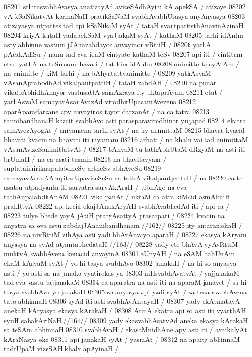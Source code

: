 08201 sthirasvabhAvasya anatizayAd avizeSAdhAyini kA apekSA / atizaye  
08202 vA kSaNikatvAt karmaNaH pratikSaNaM svabhAvabhUtasya anyAnyasya  
08203 atizayasya utpattes tad api kSaNikaM syAt / tataH svautpattisthAnavinAzinaH
08204 kriyA kutaH yadapekSaM vyaJjakaM syAt / kathaM 
08205 tarhi idAnIm asty abhinne vastuni jJAnazabdayor anvayinor vRttiH / 
08206 yathA pAcakAdiSu / nanu tad eva idaM cintyate kathaM teSv
08207 api iti / cintitam etad yathA na teSu sambhavati / tat kim idAnIm
08208 animitte te syAtAm / na animitte / kiM tarhi / na bAhyatattvanimitte /
08209 yathAsvaM vAsanAprabodhAd vikalpautpattiH / tataH zabdAH /
08210 na punar vikalpAbhidhAnayor vastusattA samAzraya ity uktaprAyam
08211 etat / yathAsvaM samayavAsanAvazAd virodhirUpasamAvezena  
08212 aparAparadarzane apy anvayinos tayor darzanAt / na ca tatra
08213 tannibandhanaH kazcit svabhAvo asti parasparavirodhinor yugapad  
08214 ekatra samAvezAyogAt / aniyamena tarhi syAt / na hy animittaM  
08215 bhavat kvacid bhavati kvacin na bhavati iti niyamam  
08216 arhati / na khalu vai tad animittaM vAsanAvizeSanimittatvAt /  
08217 bAhyaM tu tathAbhUtaM dRzyaM na asti iti brUmaH /  na ca asati tasmin 
08218 na bhavitavyam / suptataimirikaupalabdheSv artheSv abhAveSu
08219 samayavAsanAAropitarUpavizeSeSu ca tathA vikalpautpatteH / na
08220 ca te asatsu utpadyanta iti sarvatra sarvAkAraH / vibhAge na eva tathAupalabdhAnAM
08221 vikalpanAt / uktaM ca atra kiMcid asmAbhiH prakRtyA  
08222 api kecid ekajJAnakAryAH svabhAvabhedAd iti / api ca /
08223 	tulye bhede yayA jAtiH pratyAsattyA prasarpati /  
08224 	kvacin na anyatra sa eva astu zabdajJAnanibandhanam //162// 
08225 ity antarazlokaH /  
08226 	na nivRttiM vihAya asti yadi bhAvAnvayo aparaH /  
08227 	ekasya kAryam anyasya na syAd atyantabhedataH //163// 
08228 yady ete bhAvA vyAvRttiM muktvA svabhAvena kenacid anvayinA
08301 zUnyAH / na eSAM bahUnAm ekaM kAryaM syAt /  yo hi tasya svabhAvo 
08302 janakaH / na hi so anyasya asti / yo asti sa na janako vyatirekas ya
08303 niHsvabhAvatvAt / yajjanakaM tad eva vastu tajjanakaM  
08304 ca aparatra na asti iti na aparaM janayet / sa hi tasya svabhAvo yo janakaH
08305 so anyasya api yadi syAt / sa tena svabhAvena tato abhinnaH 
08306 syAd iti asti svabhAvAnvayaH / 
08307 	yady ekAtmatayA anekaH kAryasya ekasya kArakaH /  
08308 	AtmA ekatra api so asti iti vyarthAH syuH sahakAriNaH //164// 
08309 yady ekasvabhAvatvAd aneka ekasya kArakaH sa teSAm abhinnaH
08310 svabhAvaH / ekasaMnidhAne apy asti iti / avaikalyAt kAraNasya eko 
08311 api janakaH syAt / yasmAt /
08312 	na apaity abhinnaM tadrUpaM vizeSAH khalv apAyinaH / 
